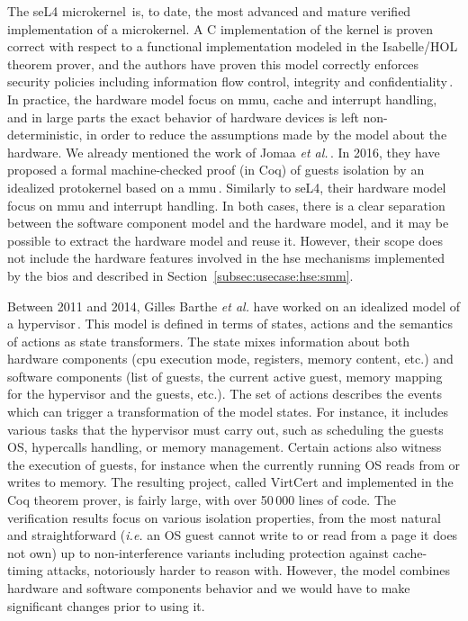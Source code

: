The seL4 microkernel\,\cite{sel4website} is, to date, the most advanced and
mature verified implementation of a microkernel.
%
A C implementation of the kernel is proven correct with respect to a functional
implementation modeled in the Isabelle/HOL theorem prover, and the authors have
proven this model correctly enforces security policies including information
flow control, integrity and confidentiality\,\cite{klein2009sel4}.
%
In practice, the hardware model focus on \ac{mmu}, cache and interrupt handling,
and in large parts the exact behavior of hardware devices is left
non-deterministic, in order to reduce the assumptions made by the model about
the hardware.
%
We already mentioned the work of Jomaa \emph{et al.}\,\cite{jomaa2016mmu}.
%
In 2016, they have proposed a formal machine-checked proof (in Coq) of guests
isolation by an idealized protokernel based on a \ac{mmu}\,\cite{jomaa2016mmu}.
%
Similarly to seL4, their hardware model focus on \ac{mmu} and interrupt
handling.
%
In both cases, there is a clear separation between the software component model
and the hardware model, and it may be possible to extract the hardware model and
reuse it.
%
However, their scope does not include the hardware features involved in the
\ac{hse} mechanisms implemented by the \ac{bios} and described in
Section~\ref{subsec:usecase:hse:smm}.

Between 2011 and 2014, Gilles Barthe \emph{et al.} have worked on an idealized
model of a
hypervisor\,\cite{barthe2011virtcert1,barthe2012virtcert2,barthe2014virtcert3}.
%
This model is defined in terms of states, actions and the semantics of actions
as state trans\-formers.
%
The state mixes information about both hardware components (\ac{cpu} execution
mode, registers, memory content, etc.) and software components (list of guests,
the current active guest, memory mapping for the hypervisor and the guests,
etc.).
%
The set of actions describes the events which can trigger a transformation of
the model states.
%
For instance, it includes various tasks that the hypervisor must carry out, such
as scheduling the guests OS, hypercalls handling, or memory management.
%
Certain actions also witness the execution of guests, for instance when the
currently running OS reads from or writes to memory.
%
The resulting project, called VirtCert and implemented in the Coq theorem
prover, is fairly large, with over 50\,000 lines of code.
%
The verification results focus on various isolation properties, from the most
natural and straightforward (\emph{i.e.} an OS guest cannot write to or read
from a page it does not own) up to non-interference variants including
protection against cache-timing attacks, notoriously harder to reason with.
%
However, the model combines hardware and software components behavior and we
would have to make significant changes prior to using it.

